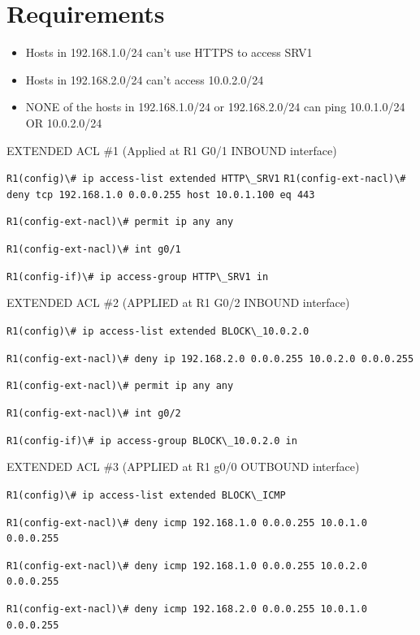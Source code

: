 \section{Requirements}\label{requirements}

\begin{itemize}
\tightlist
\item
  Hosts in 192.168.1.0/24 can't use HTTPS to access SRV1
\item
  Hosts in 192.168.2.0/24 can't access 10.0.2.0/24
\item
  NONE of the hosts in 192.168.1.0/24 or 192.168.2.0/24 can ping
  10.0.1.0/24 OR 10.0.2.0/24
\end{itemize}

EXTENDED ACL \#1 (Applied at R1 G0/1 INBOUND interface)

\passthrough{\lstinline!R1(config)\# ip access-list extended HTTP\_SRV1!}
\passthrough{\lstinline!R1(config-ext-nacl)\# deny tcp 192.168.1.0 0.0.0.255 host 10.0.1.100 eq 443!}

\passthrough{\lstinline!R1(config-ext-nacl)\# permit ip any any!}

\passthrough{\lstinline!R1(config-ext-nacl)\# int g0/1!}

\passthrough{\lstinline!R1(config-if)\# ip access-group HTTP\_SRV1 in!}

EXTENDED ACL \#2 (APPLIED at R1 G0/2 INBOUND interface)

\passthrough{\lstinline!R1(config)\# ip access-list extended BLOCK\_10.0.2.0!}

\passthrough{\lstinline!R1(config-ext-nacl)\# deny ip 192.168.2.0 0.0.0.255 10.0.2.0 0.0.0.255!}

\passthrough{\lstinline!R1(config-ext-nacl)\# permit ip any any!}

\passthrough{\lstinline!R1(config-ext-nacl)\# int g0/2!}

\passthrough{\lstinline!R1(config-if)\# ip access-group BLOCK\_10.0.2.0 in!}

EXTENDED ACL \#3 (APPLIED at R1 g0/0 OUTBOUND interface)

\passthrough{\lstinline!R1(config)\# ip access-list extended BLOCK\_ICMP!}

\passthrough{\lstinline!R1(config-ext-nacl)\# deny icmp 192.168.1.0 0.0.0.255 10.0.1.0 0.0.0.255!}

\passthrough{\lstinline!R1(config-ext-nacl)\# deny icmp 192.168.1.0 0.0.0.255 10.0.2.0 0.0.0.255!}

\passthrough{\lstinline!R1(config-ext-nacl)\# deny icmp 192.168.2.0 0.0.0.255 10.0.1.0 0.0.0.255!}

